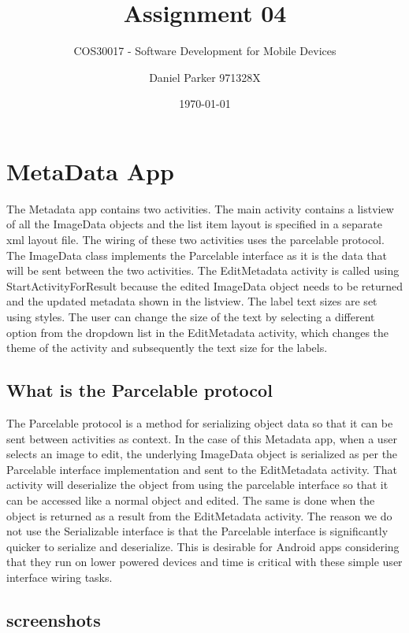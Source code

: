 \documentclass[11pt,english,numbers=endperiod,parskip=half]{scrartcl}
\title{Assignment 04}
\subtitle{COS30017 - Software Development for Mobile Devices}
\author{Daniel Parker 971328X}
\date{\today}
\begin{document}
\maketitle
\thispagestyle{empty}

\section{MetaData App}
\raggedright
The Metadata app contains two activities. The main activity contains a listview of all the ImageData objects and the list item layout is specified in a separate xml layout file. The wiring of these two activities uses the parcelable protocol. The ImageData class implements the Parcelable interface as it is the data that will be sent between the two activities. The EditMetadata activity is called using StartActivityForResult because the edited ImageData object needs to be returned and the updated metadata shown in the listview. The label text sizes are set using styles. The user can change the size of the text by selecting a different option from the dropdown list in the EditMetadata activity, which changes the theme of the activity and subsequently the text size for the labels.
\subsection{What is the Parcelable protocol}
\raggedright
The Parcelable protocol is a method for serializing object data so that it can be sent between activities as context. In the case of this Metadata app, when a user selects an image to edit, the underlying ImageData object is serialized as per the Parcelable interface implementation and sent to the EditMetadata activity. That activity will deserialize the object from using the parcelable interface so that it can be accessed like a normal object and edited. The same is done when the object is returned as a result from the EditMetadata activity. The reason we do not use the Serializable interface is that the Parcelable interface is significantly quicker to serialize and deserialize. This is desirable for Android apps considering that they run on lower powered devices and time is critical with these simple user interface wiring tasks.

\subsection{screenshots}
\setlength\fboxsep{0pt}
\setlength\fboxrule{0.5pt}
\end{document}
